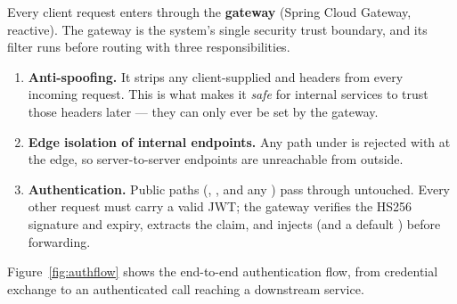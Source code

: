 Every client request enters through the \textbf{gateway} (Spring Cloud Gateway,
reactive). The gateway is the system's single security trust boundary, and its
filter runs before routing with three responsibilities.

\begin{enumerate}
  \item \textbf{Anti-spoofing.} It strips any client-supplied 
  and  headers from every incoming request. This is what makes
  it \emph{safe} for internal services to trust those headers later --- they can
  only ever be set by the gateway.
  \item \textbf{Edge isolation of internal endpoints.} Any path under
   is rejected with  at the edge, so
  server-to-server endpoints are unreachable from outside.
  \item \textbf{Authentication.} Public paths (,
  , and any ) pass through untouched. Every
  other request must carry a valid  JWT; the gateway verifies the
  HS256 signature and expiry, extracts the  claim, and injects
   (and a default ) before forwarding.
\end{enumerate}

Figure~\ref{fig:authflow} shows the end-to-end authentication flow, from
credential exchange to an authenticated call reaching a downstream service.

